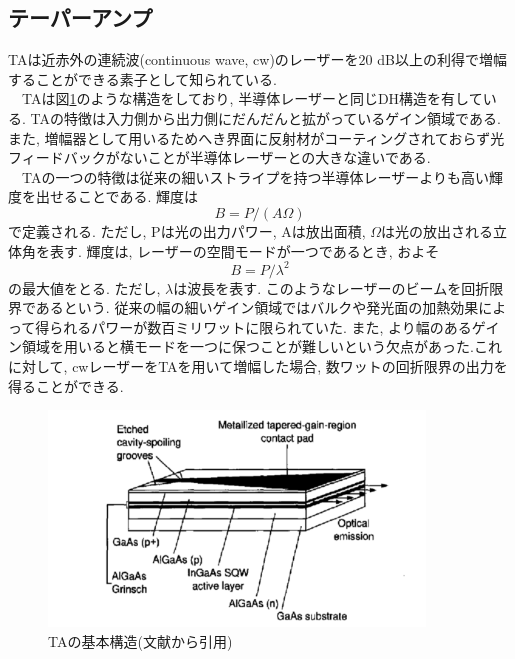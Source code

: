 \documentclass[uplatex, dvipdfmx, a4paper, report, papersize, 11pt]{jsbook}
\begin{document}
\subsection{テーパーアンプ}
 TAは近赤外の連続波(continuous wave,  cw)のレーザーを$20$ dB以上の利得で増幅することができる素子として知られている\cite{Cruz:06}.\\
　TAは図\ref{TA_structure}のような構造をしており, 半導体レーザーと同じDH構造を有している. TAの特徴は入力側から出力側にだんだんと拡がっているゲイン領域である. また, 増幅器として用いるためへき界面に反射材がコーティングされておらず光フィードバックがないことが半導体レーザーとの大きな違いである.\\
　TAの一つの特徴は従来の細いストライプを持つ半導体レーザーよりも高い輝度を出せることである. 輝度は
 \begin{equation}
   B = P/(A\Omega)
 \end{equation}
で定義される. ただし, Pは光の出力パワー, Aは放出面積, $\Omega$は光の放出される立体角を表す. 輝度は, レーザーの空間モードが一つであるとき, およそ
\begin{equation}
  B = P/\lambda^2
\end{equation}
の最大値をとる\cite{Walpole1996}. ただし, $\lambda$は波長を表す. このようなレーザーのビームを回折限界であるという. 従来の幅の細いゲイン領域ではバルクや発光面の加熱効果によって得られるパワーが数百ミリワットに限られていた. また, より幅のあるゲイン領域を用いると横モードを一つに保つことが難しいという欠点があった.これに対して, cwレーザーをTAを用いて増幅した場合, 数ワットの回折限界の出力を得ることができる\cite{Walpole1996}.


\begin{figure}[htbp]
 \begin{center}
  \includegraphics[width=100mm]{figures/chapter2/TA_structure.png}
 \end{center}
 \caption{TAの基本構造(文献\cite{Walpole1996}から引用)}
 \label{TA_structure}
\end{figure}
\end{document}
